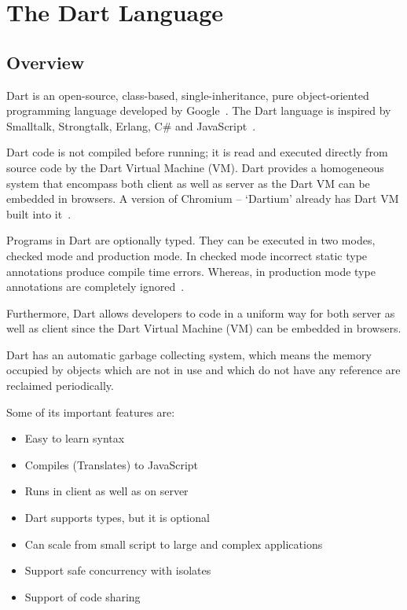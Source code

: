 \section{The Dart Language}
\label{sec:dart}
  \subsection{Overview}
  Dart is an open-source, class-based, single-inheritance, pure object-oriented programming language developed by Google~\cite{dartEcma}. The Dart language is inspired by Smalltalk, Strongtalk, Erlang, C\# and JavaScript~\cite{sethladd}.

  Dart code is not compiled before running; it is read and executed directly from source code by the Dart Virtual Machine (VM). Dart provides a homogeneous system that encompass both client as well as server as the Dart VM can be embedded in browsers. A version of Chromium – ‘Dartium’ already has Dart VM built into it~\cite{sethladd}.

  Programs in Dart are optionally typed. They can be executed in two modes, checked mode and production mode. In checked mode incorrect static type annotations produce compile time errors. Whereas, in production mode type annotations are completely ignored~\cite{dartEcma}.

  Furthermore, Dart allows developers to code in a uniform way for both server as well as client since the Dart Virtual Machine (VM) can be embedded in browsers.

  Dart has an automatic garbage collecting system, which means the memory occupied by objects which are not in use and which do not have any reference are reclaimed periodically.

Some of its important features are:
  \begin{itemize}
    \item Easy to learn syntax
    \item Compiles (Translates) to JavaScript
    \item Runs in client as well as on server
    \item Dart supports types, but it is optional
    \item Can scale from small script to large and complex applications
    \item Support safe concurrency with isolates
    \item Support of code sharing
  \end{itemize}


